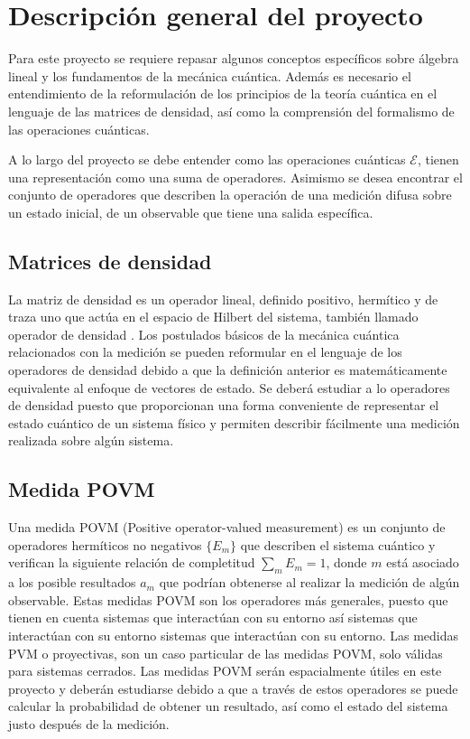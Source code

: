 \section{Descripción general del proyecto}



Para este proyecto se requiere repasar algunos conceptos específicos sobre álgebra lineal y los fundamentos de la mecánica cuántica. Además es necesario el entendimiento de la reformulación de los principios de la teoría cuántica en el lenguaje de las matrices de densidad, así como la comprensión del formalismo de las operaciones cuánticas.


 A lo largo del proyecto se debe entender como las operaciones cuánticas $\mathcal{E}$, tienen una representación como una suma de operadores. Asimismo se desea encontrar el conjunto de operadores que describen la operación de una medición difusa sobre un estado inicial, de un observable que tiene una salida específica.
 



\subsection{Matrices de densidad}

La matriz de densidad es un operador lineal, definido positivo, hermítico y de traza uno que actúa en el espacio de Hilbert del sistema, también llamado operador de densidad \cite{nielsen_chuang_2010}. Los postulados básicos de la mecánica cuántica relacionados con la medición se pueden reformular en el lenguaje de los operadores de densidad debido a que la definición anterior es matemáticamente equivalente al enfoque de vectores de estado. Se deberá estudiar a lo operadores de densidad puesto que proporcionan una forma conveniente de representar el estado cuántico de un sistema físico y permiten describir fácilmente una medición realizada sobre algún sistema.


\subsection{Medida POVM }


Una medida POVM (Positive operator-valued measurement) es un conjunto de operadores hermíticos no negativos $\{E_{m}\}$  que describen el sistema cuántico y verifican la siguiente relación de completitud $\sum _{m}E_{m}=1$, donde $m$ está asociado a los posible resultados $a_m$ que podrían obtenerse al realizar la medición de algún observable. Estas medidas POVM son los operadores más generales, puesto que tienen en cuenta  sistemas que interactúan con su entorno así sistemas que interactúan con su entorno sistemas que interactúan con su entorno. Las medidas PVM o proyectivas, son un caso particular de las medidas POVM, solo válidas para sistemas cerrados. Las medidas POVM serán espacialmente útiles en este proyecto y deberán estudiarse debido a que a través de estos operadores se puede calcular la probabilidad de obtener un resultado, así como el estado del sistema justo después de la medición.
 


